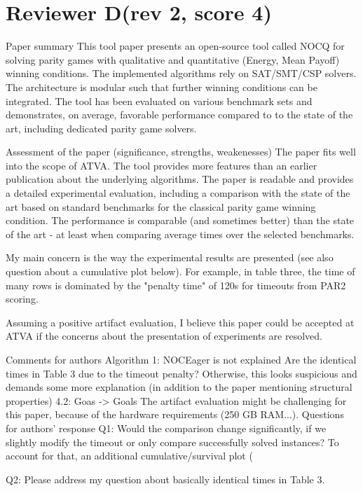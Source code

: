 \section{Reviewer D(rev 2, score 4)}\label{rev:D}
\begin{reviewer}
Paper summary
This tool paper presents an open-source tool called NOCQ for solving parity games with qualitative and quantitative (Energy, Mean Payoff) winning conditions. The implemented algorithms rely on SAT/SMT/CSP solvers. The architecture is modular such that further winning conditions can be integrated. The tool has been evaluated on various benchmark sets and demonstrates, on average, favorable performance compared to to the state of the art, including dedicated parity game solvers.

Assessment of the paper (significance, strengths, weakenesses)
The paper fits well into the scope of ATVA. The tool provides more features than an earlier publication about the underlying algorithms. The paper is readable and provides a detailed experimental evaluation, including a comparison with the state of the art based on standard benchmarks for the classical parity game winning condition. The performance is comparable (and sometimes better) than the state of the art - at least when comparing average times over the selected benchmarks.

My main concern is the way the experimental results are presented (see also question about a cumulative plot below). For example, in table three, the time of many rows is dominated by the "penalty time" of 120s for timeouts from PAR2 scoring.

Assuming a positive artifact evaluation, I believe this paper could be accepted at ATVA if the concerns about the presentation of experiments are resolved.

Comments for authors
Algorithm 1: NOCEager is not explained
Are the identical times in Table 3 due to the timeout penalty? Otherwise, this looks suspicious and demands some more explanation (in addition to the paper mentioning structural properties)
4.2: Goas -> Goals
The artifact evaluation might be challenging for this paper, because of the hardware requirements (250 GB RAM...).
Questions for authors’ response
Q1: Would the comparison change significantly, if we slightly modify the timeout or only compare successfully solved instances? To account for that, an additional cumulative/survival plot (%

Q2: Please address my question about basically identical times in Table 3.
\end{reviewer}

